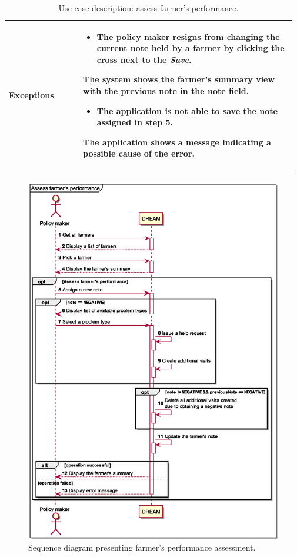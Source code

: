 \begin{longtable}{@{}p{0.25\linewidth} p{0.72\linewidth}@{}}
		\textbf{Exceptions}         & \begin{itemize}[leftmargin=.4cm,noitemsep,topsep=0pt,before=\vspace{-3mm}]
		   \item The policy maker resigns from changing the current note held by a farmer by clicking the cross next to the \textit{Save}. 
		\end{itemize}
	    The system shows the farmer's summary view with the previous note in the note field.
	    \begin{itemize}[leftmargin=.4cm,noitemsep,topsep=0pt]
		   \item The application is not able to save the note assigned in step 5.
		\end{itemize}
		The application shows a message indicating a possible cause of the error.
		\\\bottomrule
	\caption{Use case description: assess farmer's performance.} 
\end{longtable}

\begin{figure}[H]
    \centering
    \includegraphics[scale=0.6, keepaspectratio, origin=c]{diagrams/sequence/assess_farmers_performance}
    \caption{Sequence diagram presenting farmer's performance assessment.}
    \label{fig:sd_assess_farmers_performance}
\end{figure}

